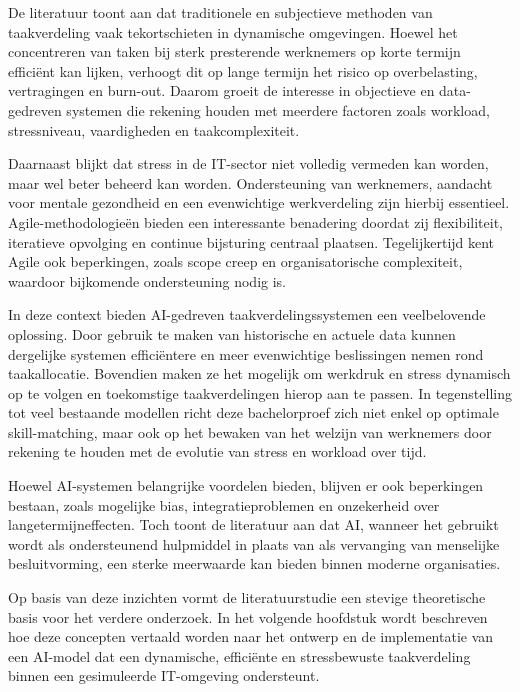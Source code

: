 De literatuur toont aan dat traditionele en subjectieve methoden van taakverdeling vaak tekortschieten in dynamische omgevingen. Hoewel het concentreren van taken bij sterk presterende werknemers op korte termijn efficiënt kan lijken, verhoogt dit op lange termijn het risico op overbelasting, vertragingen en burn-out. Daarom groeit de interesse in objectieve en data-gedreven systemen die rekening houden met meerdere factoren zoals workload, stressniveau, vaardigheden en taakcomplexiteit.

Daarnaast blijkt dat stress in de IT-sector niet volledig vermeden kan worden, maar wel beter beheerd kan worden. Ondersteuning van werknemers, aandacht voor mentale gezondheid en een evenwichtige werkverdeling zijn hierbij essentieel. Agile-methodologieën bieden een interessante benadering doordat zij flexibiliteit, iteratieve opvolging en continue bijsturing centraal plaatsen. Tegelijkertijd kent Agile ook beperkingen, zoals scope creep en organisatorische complexiteit, waardoor bijkomende ondersteuning nodig is.

In deze context bieden AI-gedreven taakverdelingssystemen een veelbelovende oplossing. Door gebruik te maken van historische en actuele data kunnen dergelijke systemen efficiëntere en meer evenwichtige beslissingen nemen rond taakallocatie. Bovendien maken ze het mogelijk om werkdruk en stress dynamisch op te volgen en toekomstige taakverdelingen hierop aan te passen. In tegenstelling tot veel bestaande modellen richt deze bachelorproef zich niet enkel op optimale skill-matching, maar ook op het bewaken van het welzijn van werknemers door rekening te houden met de evolutie van stress en workload over tijd.

Hoewel AI-systemen belangrijke voordelen bieden, blijven er ook beperkingen bestaan, zoals mogelijke bias, integratieproblemen en onzekerheid over langetermijneffecten. Toch toont de literatuur aan dat AI, wanneer het gebruikt wordt als ondersteunend hulpmiddel in plaats van als vervanging van menselijke besluitvorming, een sterke meerwaarde kan bieden binnen moderne organisaties.

Op basis van deze inzichten vormt de literatuurstudie een stevige theoretische basis voor het verdere onderzoek. In het volgende hoofdstuk wordt beschreven hoe deze concepten vertaald worden naar het ontwerp en de implementatie van een AI-model dat een dynamische, efficiënte en stressbewuste taakverdeling binnen een gesimuleerde IT-omgeving ondersteunt.


